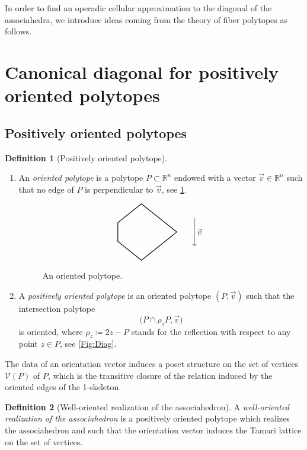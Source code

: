 \documentclass[11pt]{article}
\newcommand{\Subsection}{\subsection}
\newcommand{\skpt}{\smallskip}
\numberwithin{equation}{section}\providecommand{\No}{}
\let\mathcal\mathscr
\theoremstyle{plain}
\theoremstyle{definition}
\newtheorem{definition}{Definition}
\newcommand{\RR}{\mathbb{R}}
\newcommand{\Ve}{\mathcal{V}}
\begin{document}
In order to find an operadic cellular approximation to the diagonal of the associahedra, we introduce ideas coming from the theory of fiber polytopes \cite{BilleraSturmfels92} as follows.

\section{Canonical diagonal for positively oriented polytopes}\label{Sec:CanDia}

\Subsection{Positively oriented polytopes}

\skpt
\begin{definition}[Positively oriented polytope]
\begin{enumerate}
\item An \emph{oriented polytope} is a polytope $P\subset \RR^n$ endowed with a vector $\vec v\in \RR^n$ such that no edge of $P$ is perpendicular to $\vec v$, see \cref{Fig:PosOr}.
\begin{figure}[htb]
\[\vcenter{\hbox{
\begin{tikzpicture}[xscale=0.5, yscale=0.4]
\draw[thick] (0,3)--(-2,1)--(-2,-1)--(0,-3)--(3,0)--cycle;
\draw[->] (4.5,1.5)--(4.5,-1.5);
\draw (4.5,0) node[right] {$\vec v$};
\end{tikzpicture}
}}\]
\caption{An oriented polytope.}\label{Fig:PosOr}
\end{figure}

\item A \emph{positively oriented polytope} is an oriented polytope $(P, \vec v)$ such that the intersection polytope
\[
\big(P\cap \rho_z P, \vec v\big)
\]
is oriented, where $\rho_z\coloneqq 2z-P$ stands for the reflection with respect to any point $z\in P$, see \cref{Fig:Diag}.
\end{enumerate}
\end{definition}

The data of an orientation vector induces a poset structure on the set of vertices $\Ve(P)$ of $P$, which is the transitive closure of the relation induced by the oriented edges of the 1-skeleton.

\begin{definition}[Well-oriented realization of the associahedron]
A \emph{well-oriented reali\-zation of the associahedron} is a positively oriented polytope which realizes the associahedron and such that the orientation vector induces the Tamari lattice on the set of vertices.
\end{definition}
\end{document}
